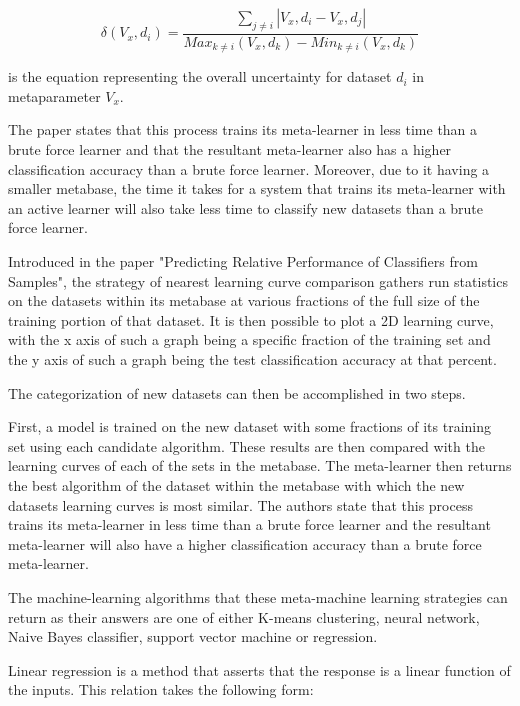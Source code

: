 $$\delta(V_x,d_i) = \frac{\sum_{j\neq i} |V_x,d_i - V_x,d_j|}{Max_{k\neq i}(V_x,d_k)- Min_{k\neq i}(V_x,d_k)}$$

is the equation representing the overall uncertainty for dataset
$d_i$ in metaparameter $V_x$.

The paper states that this process trains its meta-learner in less time than
a brute force learner and that the resultant meta-learner also has a higher
classification accuracy than a brute force learner. Moreover, due to it having
a smaller metabase, the time it takes for a system that trains its meta-learner
with an active learner will also take less time to classify new datasets than
a brute force learner.

Introduced in the paper "Predicting Relative Performance of Classifiers from
Samples", the strategy of nearest learning curve comparison gathers run
statistics on the datasets within its metabase at various fractions of the full
size of the training portion of that dataset. It is then possible to plot a 2D
learning curve, with the x axis of such a graph being a specific fraction of the
training set and the y axis of such a graph being the test classification
accuracy at that percent.

The categorization of new datasets can then be accomplished in two steps.

First, a model is trained on the new dataset with some fractions of its
training set using each candidate algorithm. These results are
then compared with the learning curves of each of the sets in the metabase.
The meta-learner then returns the best algorithm of the dataset within the
metabase with which the new datasets learning curves is most similar. The
authors state that this process trains its meta-learner in less time than a
brute force learner and the resultant meta-learner will also have a higher
classification accuracy than a brute force meta-learner.

The machine-learning algorithms that these meta-machine learning strategies
can return as their answers are one of either K-means clustering, neural network,
Naive Bayes classifier, support vector machine or regression.

Linear regression is a method that asserts that the response is a linear
function of the inputs. This relation takes the following form:

